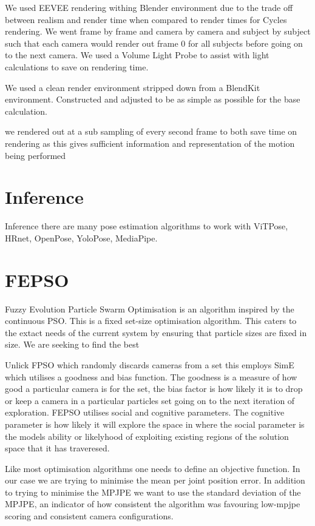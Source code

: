 We used EEVEE rendering withing Blender environment due to the trade off between realism and render time when compared to render times for Cycles rendering. 
We went frame by frame and camera by camera and subject by subject such that each camera would render out frame 0 for all subjects before going on to the next camera.
We used a Volume Light Probe to assist with light calculations to save on rendering time.

We used a clean render environment stripped down from a BlendKit environment. Constructed and adjusted to be as simple as possible for the base calculation.

we rendered out at a sub sampling of every second frame to both save time on rendering as this gives sufficient information and representation of the motion being performed
\section{Inference}

Inference there are many pose estimation algorithms to work with ViTPose, HRnet, OpenPose, YoloPose, MediaPipe.  
\section{FEPSO}

Fuzzy Evolution Particle Swarm Optimisation is an algorithm inspired by the continuous PSO. This is a fixed set-size optimisation algorithm. This caters to the extact needs of the current system by ensuring that particle sizes are fixed in size. We are seeking to find the best

Unlick FPSO which randomly discards cameras from a set this employs SimE which utilises a goodness and bias function. The goodness is a measure of how good a particular camera is for the set, the bias factor is how likely it is to drop or keep a camera in a particular particles set going on to the next iteration of exploration.
FEPSO utilises social and cognitive parameters. The cognitive parameter is how likely it will explore the space in where the social parameter is the models ability or likelyhood of exploiting existing regions of the solution space that it has traveresed.

Like most optimisation algorithms one needs to define an objective function. In our case we are trying to minimise the mean per joint position error. In addition to trying to minimise the MPJPE we want to use the standard deviation of the MPJPE, an indicator of how consistent the algorithm was favouring low-mpjpe scoring and consistent camera configurations.

